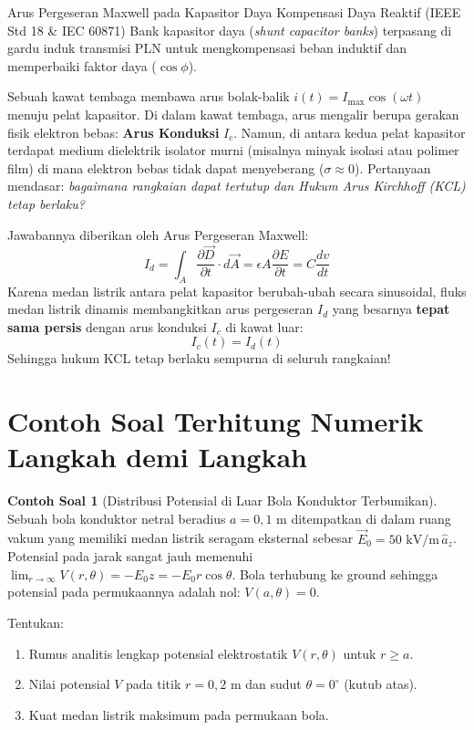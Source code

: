 \documentclass[11pt,a4paper]{article}
\theoremstyle{definition}
\newtheorem{example}{Contoh Soal}[section]
\begin{document}
\begin{casebox}{Arus Pergeseran Maxwell pada Kapasitor Daya Kompensasi Daya Reaktif (IEEE Std 18 \& IEC 60871)}
Bank kapasitor daya (\textit{shunt capacitor banks}) terpasang di gardu induk transmisi PLN untuk mengkompensasi beban induktif dan memperbaiki faktor daya ($\cos\phi$).

Sebuah kawat tembaga membawa arus bolak-balik $i(t) = I_{\max} \cos(\omega t)$ menuju pelat kapasitor. Di dalam kawat tembaga, arus mengalir berupa gerakan fisik elektron bebas: \textbf{Arus Konduksi} $I_c$. Namun, di antara kedua pelat kapasitor terdapat medium dielektrik isolator murni (misalnya minyak isolasi atau polimer film) di mana elektron bebas tidak dapat menyeberang ($\sigma \approx 0$). Pertanyaan mendasar: \textit{bagaimana rangkaian dapat tertutup dan Hukum Arus Kirchhoff (KCL) tetap berlaku?}

Jawabannya diberikan oleh Arus Pergeseran Maxwell:
\begin{equation}
    I_d = \int_A \frac{\partial \vec{D}}{\partial t} \cdot d\vec{A} = \epsilon A \frac{\partial E}{\partial t} = C \frac{dv}{dt}
\end{equation}
Karena medan listrik antara pelat kapasitor berubah-ubah secara sinusoidal, fluks medan listrik dinamis membangkitkan arus pergeseran $I_d$ yang besarnya \textbf{tepat sama persis} dengan arus konduksi $I_c$ di kawat luar:
\begin{equation}
    I_c(t) = I_d(t)
\end{equation}
Sehingga hukum KCL tetap berlaku sempurna di seluruh rangkaian!
\end{casebox}

\section{Contoh Soal Terhitung Numerik Langkah demi Langkah}

\begin{example}[Distribusi Potensial di Luar Bola Konduktor Terbumikan]
Sebuah bola konduktor netral beradius $a = 0{,}1\text{ m}$ ditempatkan di dalam ruang vakum yang memiliki medan listrik seragam eksternal sebesar $\vec{E}_0 = 50\text{ kV/m} \, \hat{a}_z$. Potensial pada jarak sangat jauh memenuhi $\lim_{r \to \infty} V(r, \theta) = -E_0 z = -E_0 r \cos\theta$. Bola terhubung ke ground sehingga potensial pada permukaannya adalah nol: $V(a, \theta) = 0$.

Tentukan:
\begin{enumerate}[leftmargin=*]
    \item Rumus analitis lengkap potensial elektrostatik $V(r, \theta)$ untuk $r \ge a$.
    \item Nilai potensial $V$ pada titik $r = 0{,}2\text{ m}$ dan sudut $\theta = 0^\circ$ (kutub atas).
    \item Kuat medan listrik maksimum pada permukaan bola.
\end{enumerate}
\end{example}
\end{document}
